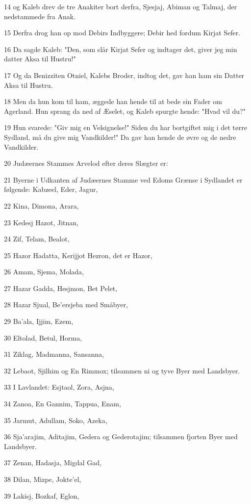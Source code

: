 \par 14 og Kaleb drev de tre Anakiter bort derfra, Sjesjaj, Abiman og Talmaj, der nedstammede fra Anak.
\par 15 Derfra drog han op mod Debirs Indbyggere; Debir hed fordum Kirjat Sefer.
\par 16 Da sagde Kaleb: "Den, som slår Kirjat Sefer og indtager det, giver jeg min datter Aksa til Hustru!"
\par 17 Og da Benizziten Otniel, Kalebs Broder, indtog det, gav han ham sin Datter Aksa til Hustru.
\par 18 Men da hun kom til ham, æggede han hende til at bede sin Fader om Agerland. Hun sprang da ned af Æselet, og Kaleb spurgte hende: "Hvad vil du?"
\par 19 Hun svarede: "Giv mig en Velsignelse!" Siden du har bortgiftet mig i det tørre Sydland, må du give mig Vandkilder!" Da gav han hende de øvre og de nedre Vandkilder.
\par 20 Judæernes Stammes Arvelod efter deres Slægter er:
\par 21 Byerne i Udkanten af Judæernes Stamme ved Edoms Grænse i Sydlandet er følgende: Kabzeel, Eder, Jagur,
\par 22 Kina, Dimona, Arara,
\par 23 Kedesj Hazot, Jitnan,
\par 24 Zif, Telam, Bealot,
\par 25 Hazor Hadatta, Kerijjot Hezron, det er Hazor,
\par 26 Amam, Sjema, Molada,
\par 27 Hazar Gadda, Hesjmon, Bet Pelet,
\par 28 Hazar Sjual, Be'ersjeba med Småbyer,
\par 29 Ba'ala, Ijjim, Ezem,
\par 30 Eltolad, Betul, Horma,
\par 31 Ziklag, Madmanna, Sansanna,
\par 32 Lebaot, Sjilhim og En Rimmox; tilsammen ni og tyve Byer med Landsbyer.
\par 33 I Lavlandet: Esjtaol, Zora, Asjna,
\par 34 Zanoa, En Gannim, Tappua, Enam,
\par 35 Jarmut, Adullam, Soko, Azeka,
\par 36 Sja'arajim, Aditajim, Gedera og Gederotajim; tilsammen fjorten Byer med Landsbyer.
\par 37 Zenan, Hadasja, Migdal Gad,
\par 38 Dilan, Mizpe, Jokte'el,
\par 39 Lakisj, Bozkaf, Eglon,
